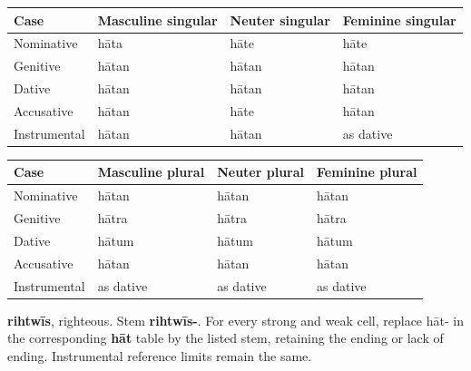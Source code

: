 \par\begingroup
\fontsize{10.5}{13.2}\selectfont
\setlength{\LTleft}{0pt}\setlength{\LTright}{\fill}
\noindent
\begin{tabular}{@{}>{\raggedright\arraybackslash}p{22.0mm}>{\raggedright\arraybackslash}p{31.188mm}>{\raggedright\arraybackslash}p{31.188mm}>{\raggedright\arraybackslash}p{31.188mm}@{}}
\toprule
\textbf{Case} & \textbf{Masculine singular} & \textbf{Neuter singular} & \textbf{Feminine singular} \\
\midrule
Nominative & hāta & hāte & hāte \\
Genitive & hātan & hātan & hātan \\
Dative & hātan & hātan & hātan \\
Accusative & hātan & hāte & hātan \\
Instrumental & hātan & hātan & as dative \\
\bottomrule
\end{tabular}
\par\endgroup
\par\addvspace{5pt}
\par\begingroup
\fontsize{10.5}{13.2}\selectfont
\setlength{\LTleft}{0pt}\setlength{\LTright}{\fill}
\noindent
\begin{tabular}{@{}>{\raggedright\arraybackslash}p{22.0mm}>{\raggedright\arraybackslash}p{31.188mm}>{\raggedright\arraybackslash}p{31.188mm}>{\raggedright\arraybackslash}p{31.188mm}@{}}
\toprule
\textbf{Case} & \textbf{Masculine plural} & \textbf{Neuter plural} & \textbf{Feminine plural} \\
\midrule
Nominative & hātan & hātan & hātan \\
Genitive & hātra & hātra & hātra \\
Dative & hātum & hātum & hātum \\
Accusative & hātan & hātan & hātan \\
Instrumental & as dative & as dative & as dative \\
\bottomrule
\end{tabular}
\par\endgroup

\textbf{rihtwīs}, righteous. Stem \textbf{rihtwīs-}. For every strong and weak cell, replace hāt- in the corresponding \textbf{hāt} table by the listed stem, retaining the ending or lack of ending. Instrumental reference limits remain the same.

